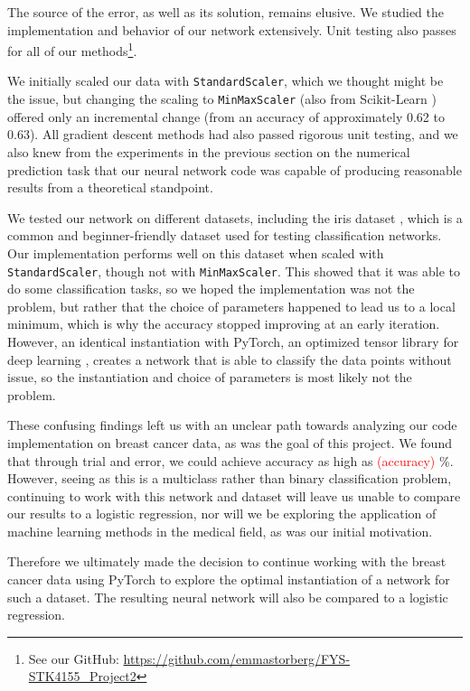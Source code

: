The source of the error, as well as its solution, remains elusive. We studied the implementation and behavior of our network extensively. Unit testing also passes for all of our methods\footnote{See our GitHub: \url{https://github.com/emmastorberg/FYS-STK4155_Project2}}.  

We initially scaled our data with \texttt{StandardScaler}, which we thought might be the issue, but changing the scaling to \texttt{MinMaxScaler} (also from Scikit-Learn \cite{sklearnScaling}) offered only an incremental change (from an accuracy of approximately 0.62 to 0.63). All gradient descent methods had also passed rigorous unit testing, and we also knew from the experiments in the previous section on the numerical prediction task that our neural network code was capable of producing reasonable results from a theoretical standpoint. 

We tested our network on different datasets, including the iris dataset \cite{irisdataset}, which is a common and beginner-friendly dataset used for testing classification networks. Our implementation performs well on this dataset when scaled with \texttt{StandardScaler}, though not with \texttt{MinMaxScaler}. This showed that it was able to do some classification tasks, so we hoped the implementation was not the problem, but rather that the choice of parameters happened to lead us to a local minimum, which is why the accuracy stopped improving at an early iteration. However, an identical instantiation with PyTorch, an optimized tensor library for deep learning \cite{pytorch}, creates a network that is able to classify the data points without issue, so the instantiation and choice of parameters is most likely not the problem.

These confusing findings left us with an unclear path towards analyzing our code implementation on breast cancer data, as was the goal of this project. We found that through trial and error, we could achieve accuracy as high as \textcolor{red}{(accuracy)} \%. However, seeing as this is a multiclass rather than binary classification problem, continuing to work with this network and dataset will leave us unable to compare our results to a logistic regression, nor will we be exploring the application of machine learning methods in the medical field, as was our initial motivation.

Therefore we ultimately made the decision to continue working with the breast cancer data using PyTorch to explore the optimal instantiation of a network for such a dataset. The resulting neural network will also be compared to a logistic regression. 

